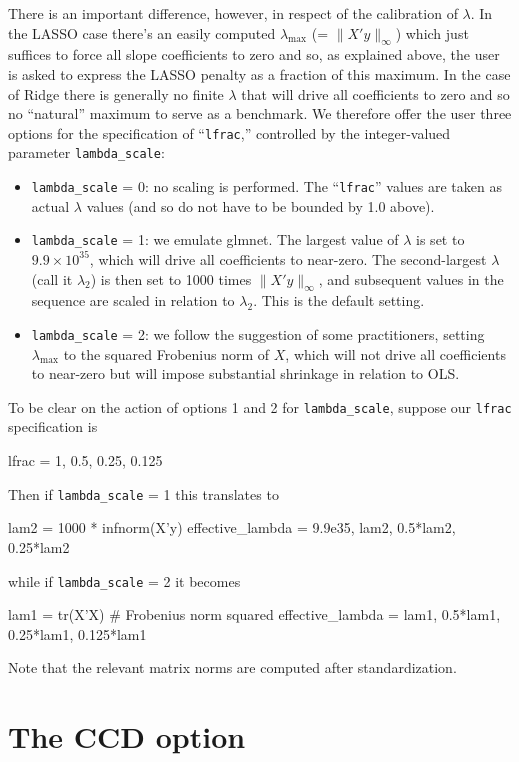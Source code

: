 \documentclass{article}
\begin{document}
There is an important difference, however, in respect of the
calibration of $\lambda$. In the LASSO case there's an easily computed
$\lambda_{\max}$ (= $\|X'y\|_{\infty}$) which just suffices to force
all slope coefficients to zero and so, as explained above, the user is
asked to express the LASSO penalty as a fraction of this maximum. In
the case of Ridge there is generally no finite $\lambda$ that will
drive all coefficients to zero and so no ``natural'' maximum to serve
as a benchmark. We therefore offer the user three options for the
specification of ``\texttt{lfrac},'' controlled by the integer-valued
parameter \texttt{lambda\_scale}:
\begin{itemize}
\item \texttt{lambda\_scale} = 0: no scaling is performed. The
  ``\texttt{lfrac}'' values are taken as actual $\lambda$ values (and
  so do not have to be bounded by 1.0 above).
\item \texttt{lambda\_scale} = 1: we emulate \textsf{glmnet}. The
  largest value of $\lambda$ is set to $9.9 \times 10^{35}$, which
  will drive all coefficients to near-zero. The second-largest
  $\lambda$ (call it $\lambda_2$) is then set to 1000 times
  $\|X'y\|_{\infty}$, and subsequent values in the sequence are scaled
  in relation to $\lambda_2$. This is the default setting.
\item \texttt{lambda\_scale} = 2: we follow the suggestion of some
  practitioners, setting $\lambda_{\max}$ to the squared Frobenius
  norm of $X$, which will not drive all coefficients to near-zero but
  will impose substantial shrinkage in relation to OLS.
\end{itemize}

To be clear on the action of options 1 and 2 for
\texttt{lambda\_scale}, suppose our \texttt{lfrac} specification is
\begin{code}
lfrac = {1, 0.5, 0.25, 0.125}
\end{code}
Then if \texttt{lambda\_scale} = 1 this translates to
\begin{code}
lam2 = 1000 * infnorm(X'y)
effective_lambda = {9.9e35, lam2, 0.5*lam2, 0.25*lam2}
\end{code}
while if \texttt{lambda\_scale} = 2 it becomes
\begin{code}
lam1 = tr(X'X) # Frobenius norm squared
effective_lambda = {lam1, 0.5*lam1, 0.25*lam1, 0.125*lam1}
\end{code}
Note that the relevant matrix norms are computed after
standardization.

\section{The CCD option}
\label{sec:ccd}
\end{document}
